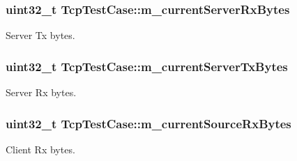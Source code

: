 \subsubsection[{\texorpdfstring{m\+\_\+current\+Server\+Rx\+Bytes}{m_currentServerRxBytes}}]{\setlength{\rightskip}{0pt plus 5cm}uint32\+\_\+t Tcp\+Test\+Case\+::m\+\_\+current\+Server\+Rx\+Bytes\hspace{0.3cm}{\ttfamily [private]}}\hypertarget{classTcpTestCase_aef99b385054dd7eb73a7e45b2ce3d976}{}\label{classTcpTestCase_aef99b385054dd7eb73a7e45b2ce3d976}


Server Tx bytes. 

\subsubsection[{\texorpdfstring{m\+\_\+current\+Server\+Tx\+Bytes}{m_currentServerTxBytes}}]{\setlength{\rightskip}{0pt plus 5cm}uint32\+\_\+t Tcp\+Test\+Case\+::m\+\_\+current\+Server\+Tx\+Bytes\hspace{0.3cm}{\ttfamily [private]}}\hypertarget{classTcpTestCase_a3a7557075e3c745e487f76f26bca6423}{}\label{classTcpTestCase_a3a7557075e3c745e487f76f26bca6423}


Server Rx bytes. 

\subsubsection[{\texorpdfstring{m\+\_\+current\+Source\+Rx\+Bytes}{m_currentSourceRxBytes}}]{\setlength{\rightskip}{0pt plus 5cm}uint32\+\_\+t Tcp\+Test\+Case\+::m\+\_\+current\+Source\+Rx\+Bytes\hspace{0.3cm}{\ttfamily [private]}}\hypertarget{classTcpTestCase_a955064e2af5b339a49a3aa3a04f166f8}{}\label{classTcpTestCase_a955064e2af5b339a49a3aa3a04f166f8}


Client Rx bytes. 

